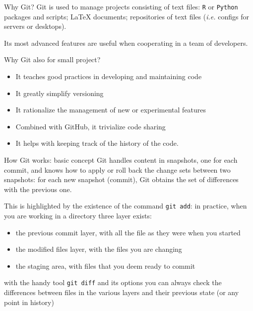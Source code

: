 \documentclass[aspectratio=169]{beamer}
\newcommand{\git}{Git{}}
\newcommand{\cd}[1]{\texttt{#1}}
\begin{document}
\begin{frame}{Why \git?}
    \git{} is used to manage projects consisting of \alert{text files}: \cd{R} or \cd{Python} packages and scripts; \LaTeX{} documents; repositories of text files (\textit{i.e.} configs for servers or desktops).
    
    Its most advanced features are useful when cooperating in a team of developers.
    \begin{block}{Why \git{} also for small project?}
        \begin{itemize}
        \justifying
            \item It teaches \alert{good practices} in developing and maintaining code
            \item It greatly simplify \alert{versioning} 
            \item It rationalize the management of new or experimental features
            \item Combined with GitHub, it trivialize \alert{code sharing}
            \item It helps with keeping track of the \alert{history of the code}.
        \end{itemize}
    \end{block}
\end{frame}

\begin{frame}{How \git{} works: basic concept}
    \git{} handles content in snapshots, one for each \alert{commit}, and knows how to apply or roll back the \alert{change sets} between two snapshots: for each new snapshot (commit), \git{} obtains the set of differences with the previous one.
    
    This is highlighted by the existence of the command \cd{git add}: in practice, when you are working in a directory three layer exists: 
    \begin{itemize}\justifying
        \item the \alert{previous commit} layer, with all the file as they were when you started
        \item the \alert{modified files} layer, with the files you are changing
        \item the \alert{staging area}, with files that you deem ready to commit
    \end{itemize}
    with the handy tool \cd{git diff} and its options you can always check the differences between files in the various layers and their previous state (or any point in history)
\end{frame}
\end{document}
